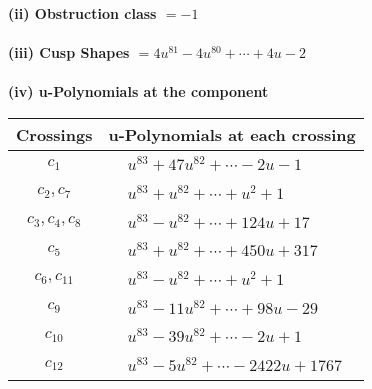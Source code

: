 \documentclass[1p]{elsarticle_modified}
\theoremstyle{definition}
\begin{document}
\flushleft \textbf{(ii) Obstruction class $= -1$}\\~\\
\flushleft \textbf{(iii) Cusp Shapes $= 4 u^{81}-4 u^{80}+\cdots+4 u-2$}\\~\\
\newpage\renewcommand{\arraystretch}{1}
\flushleft \textbf{(iv) u-Polynomials at the component}\newline \\
\begin{tabular}{m{50pt}|m{274pt}}
Crossings & \hspace{64pt}u-Polynomials at each crossing \\
\hline $$\begin{aligned}c_{1}\end{aligned}$$&$\begin{aligned}
&u^{83}+47 u^{82}+\cdots-2 u-1
\end{aligned}$\\
\hline $$\begin{aligned}c_{2},c_{7}\end{aligned}$$&$\begin{aligned}
&u^{83}+u^{82}+\cdots+u^2+1
\end{aligned}$\\
\hline $$\begin{aligned}c_{3},c_{4},c_{8}\end{aligned}$$&$\begin{aligned}
&u^{83}- u^{82}+\cdots+124 u+17
\end{aligned}$\\
\hline $$\begin{aligned}c_{5}\end{aligned}$$&$\begin{aligned}
&u^{83}+u^{82}+\cdots+450 u+317
\end{aligned}$\\
\hline $$\begin{aligned}c_{6},c_{11}\end{aligned}$$&$\begin{aligned}
&u^{83}- u^{82}+\cdots+u^2+1
\end{aligned}$\\
\hline $$\begin{aligned}c_{9}\end{aligned}$$&$\begin{aligned}
&u^{83}-11 u^{82}+\cdots+98 u-29
\end{aligned}$\\
\hline $$\begin{aligned}c_{10}\end{aligned}$$&$\begin{aligned}
&u^{83}-39 u^{82}+\cdots-2 u+1
\end{aligned}$\\
\hline $$\begin{aligned}c_{12}\end{aligned}$$&$\begin{aligned}
&u^{83}-5 u^{82}+\cdots-2422 u+1767
\end{aligned}$\\
\hline
\end{tabular}\\~\\
\end{document}
